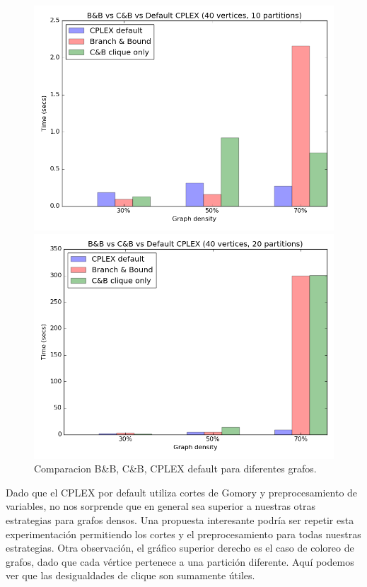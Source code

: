 \begin{figure}[h]
\begin{minipage}[b]{0.49\textwidth}
    \includegraphics[width=\textwidth]{img/8-compare_v40_p10_i1_l40_t1_b0.png}
  \end{minipage}
  \hfill
  \begin{minipage}[b]{0.49\textwidth}
    \includegraphics[width=\textwidth]{img/8-compare_v40_p20_i1_l40_t1_b0.png}
  \end{minipage}
	\caption{Comparacion B\&B, C\&B, CPLEX default para diferentes grafos.}
\end{figure}

Dado que el CPLEX por default utiliza cortes de Gomory y preprocesamiento de variables, no nos sorprende que en general sea superior a nuestras otras estrategias para grafos densos. Una propuesta interesante podría ser repetir esta experimentación permitiendo los cortes y el preprocesamiento para todas nuestras estrategias. Otra observación, el gráfico superior derecho es el caso de coloreo de grafos, dado que cada vértice pertenece a una partición diferente. Aquí podemos ver que las desigualdades de clique son sumamente útiles. 

